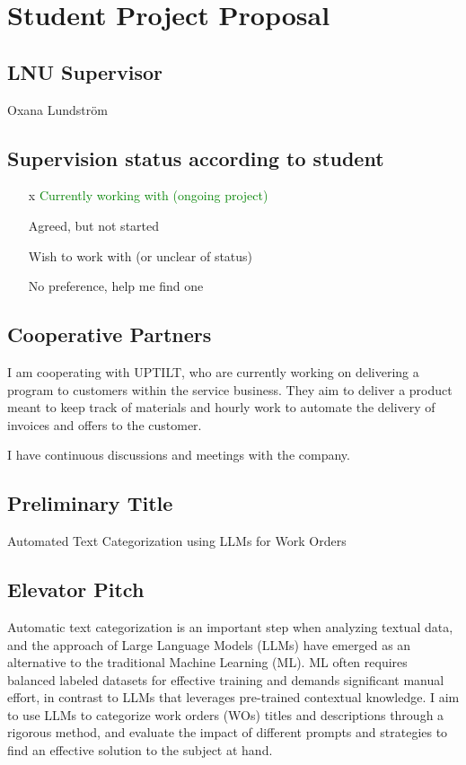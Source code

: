 \section{Student Project Proposal}

\subsection{LNU Supervisor}
Oxana Lundström

\subsection{Supervision status according to student}

\begin{itemize}
    \item [x] \textcolor{green}{Currently working with (ongoing project)}
    \item [ ] Agreed, but not started
    \item [ ] Wish to work with (or unclear of status)
    \item [ ] No preference, help me find one
\end{itemize}

\subsection{Cooperative Partners}

I am cooperating with UPTILT, who are currently working on delivering a
program to customers within the service business.
They aim to deliver a product meant to keep track of materials and hourly work
to automate the delivery of invoices and offers to the customer.

I have continuous discussions and meetings with the company.

\subsection{Preliminary Title}

Automated Text Categorization using LLMs for Work Orders

\subsection{Elevator Pitch}

Automatic text categorization is an important step when analyzing textual data,
and the approach of Large Language Models (LLMs) have emerged as an alternative
to the traditional Machine Learning (ML).
ML often requires balanced labeled datasets for effective training
and demands significant manual effort, in contrast to LLMs that
leverages pre-trained contextual knowledge.
I aim to use LLMs to categorize work orders (WOs) titles and descriptions
through a rigorous method,
and evaluate the impact of different prompts and strategies to find
an effective solution to the subject at hand.

